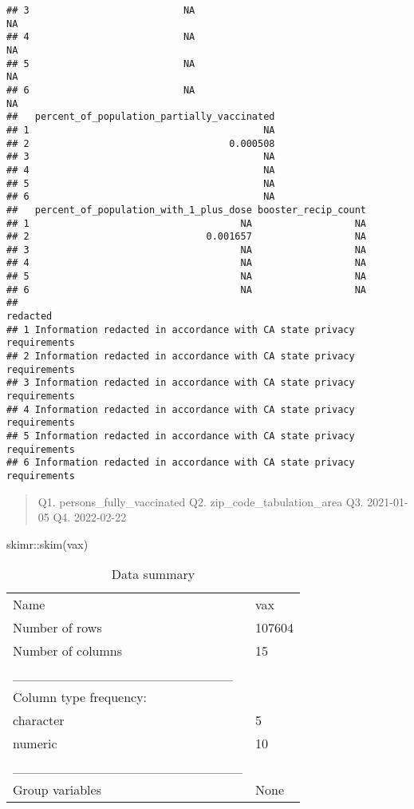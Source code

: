 \documentclass[
]{article}
\newenvironment{Shaded}{\begin{snugshade}}{\end{snugshade}}
\newcommand{\FunctionTok}[1]{\textcolor[rgb]{0.00,0.00,0.00}{#1}}
\newcommand{\NormalTok}[1]{#1}
\newcommand{\SpecialCharTok}[1]{\textcolor[rgb]{0.00,0.00,0.00}{#1}}
\begin{document}
\begin{verbatim}
## 3                           NA                                     NA
## 4                           NA                                     NA
## 5                           NA                                     NA
## 6                           NA                                     NA
##   percent_of_population_partially_vaccinated
## 1                                         NA
## 2                                   0.000508
## 3                                         NA
## 4                                         NA
## 5                                         NA
## 6                                         NA
##   percent_of_population_with_1_plus_dose booster_recip_count
## 1                                     NA                  NA
## 2                               0.001657                  NA
## 3                                     NA                  NA
## 4                                     NA                  NA
## 5                                     NA                  NA
## 6                                     NA                  NA
##                                                                redacted
## 1 Information redacted in accordance with CA state privacy requirements
## 2 Information redacted in accordance with CA state privacy requirements
## 3 Information redacted in accordance with CA state privacy requirements
## 4 Information redacted in accordance with CA state privacy requirements
## 5 Information redacted in accordance with CA state privacy requirements
## 6 Information redacted in accordance with CA state privacy requirements
\end{verbatim}

\begin{quote}
Q1. persons\_fully\_vaccinated Q2. zip\_code\_tabulation\_area Q3.
2021-01-05 Q4. 2022-02-22
\end{quote}

\begin{Shaded}
\begin{Highlighting}[]
\NormalTok{skimr}\SpecialCharTok{::}\FunctionTok{skim}\NormalTok{(vax)}
\end{Highlighting}
\end{Shaded}

\begin{longtable}[]{@{}ll@{}}
\caption{Data summary}\tabularnewline
\toprule
\endhead
Name & vax \\
Number of rows & 107604 \\
Number of columns & 15 \\
\_\_\_\_\_\_\_\_\_\_\_\_\_\_\_\_\_\_\_\_\_\_\_ & \\
Column type frequency: & \\
character & 5 \\
numeric & 10 \\
\_\_\_\_\_\_\_\_\_\_\_\_\_\_\_\_\_\_\_\_\_\_\_\_ & \\
Group variables & None \\
\bottomrule
\end{longtable}
\end{document}
